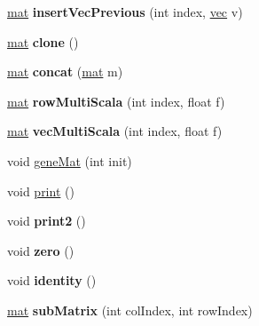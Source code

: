 \begin{DoxyCompactItemize}
\mbox{\hyperlink{class_matrix_vector_1_1mat}{mat}} {\bfseries insert\+Vec\+Previous} (int index, \mbox{\hyperlink{class_matrix_vector_1_1vec}{vec}} v)
\item 
\mbox{\label{class_matrix_vector_1_1mat_a08dd3ca70b0dfb818c7512d1ac95b809}} 
\mbox{\hyperlink{class_matrix_vector_1_1mat}{mat}} {\bfseries clone} ()
\item 
\mbox{\label{class_matrix_vector_1_1mat_a07048cbc53f81411fe3be2476aacb4a0}} 
\mbox{\hyperlink{class_matrix_vector_1_1mat}{mat}} {\bfseries concat} (\mbox{\hyperlink{class_matrix_vector_1_1mat}{mat}} m)
\item 
\mbox{\label{class_matrix_vector_1_1mat_a2e90963266e2c11da30100f8fab7dc54}} 
\mbox{\hyperlink{class_matrix_vector_1_1mat}{mat}} {\bfseries row\+Multi\+Scala} (int index, float f)
\item 
\mbox{\label{class_matrix_vector_1_1mat_af786ab2d8b7bf7b85cf61c9cc76a3cbe}} 
\mbox{\hyperlink{class_matrix_vector_1_1mat}{mat}} {\bfseries vec\+Multi\+Scala} (int index, float f)
\item 
void \mbox{\hyperlink{class_matrix_vector_1_1mat_a8906d4f0766b3bdac3a45e565ce92616}{gene\+Mat}} (int init)
\item 
void \mbox{\hyperlink{class_matrix_vector_1_1mat_ae18b1579a3eaef088178cff21f3d6a34}{print}} ()
\item 
\mbox{\label{class_matrix_vector_1_1mat_a1d8fafb8d49e850f15ae606d66a16bdd}} 
void {\bfseries print2} ()
\item 
\mbox{\label{class_matrix_vector_1_1mat_a5b8a448a9e7e296cb686e75626ffb78a}} 
void {\bfseries zero} ()
\item 
\mbox{\label{class_matrix_vector_1_1mat_aed9d65afbbe617320d4dc9af8809fc50}} 
void {\bfseries identity} ()
\item 
\mbox{\label{class_matrix_vector_1_1mat_ae1062d23d388a0a421ab91b41421a962}} 
\mbox{\hyperlink{class_matrix_vector_1_1mat}{mat}} {\bfseries sub\+Matrix} (int col\+Index, int row\+Index)

\end{DoxyCompactItemize}
